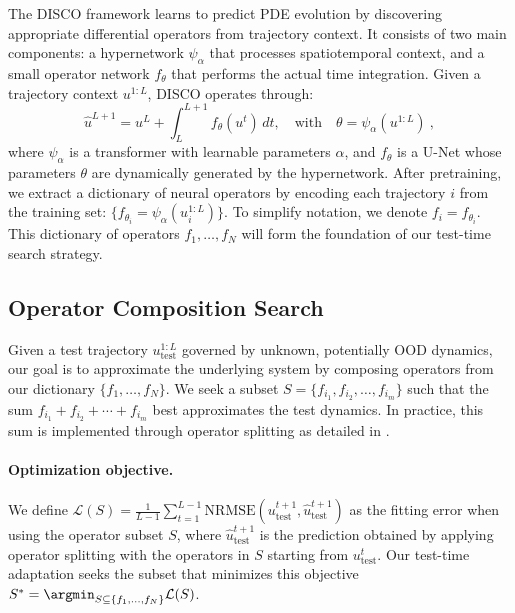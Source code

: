 \documentclass{article}
\theoremstyle{plain}
\theoremstyle{definition}
\theoremstyle{remark}
\begin{document}
The DISCO framework \citep{morel2025disco} learns to predict PDE evolution by discovering appropriate differential operators from trajectory context. It consists of two main components: a hypernetwork $\psi_\alpha$ that processes spatiotemporal context, and a small operator network $f_\theta$ that performs the actual time integration. Given a trajectory context $u^{1:L}$, DISCO operates through: 
$$
\hat{u}^{L+1} = u^L + \int_L^{L+1} f_\theta(u^t)\, dt, \quad \text{with} \quad \theta = \psi_\alpha(u^{1:L})~,
$$
where $\psi_\alpha$ 
is a transformer
with learnable parameters $\alpha$, and $f_\theta$ is a U-Net 
whose parameters $\theta$ are dynamically generated by the hypernetwork.
After pretraining, we extract a dictionary of neural operators by encoding each trajectory $i$ from the training set: 
$\{f_{\theta_i} = \psi_\alpha(u_i^{1:L})\}$. 
To simplify notation, we denote $f_i = f_{\theta_i}$. This dictionary of operators ${f_1, \ldots, f_N}$ will form the foundation of our test-time search strategy. 

\subsection{Operator Composition Search}
\label{subsec:search}

Given a test trajectory $u_{\text{test}}^{1:L}$ governed by unknown, potentially OOD dynamics, our goal is to approximate the underlying system by composing operators from our dictionary $\{f_1, \ldots, f_N\}$. We seek a subset $S = \{f_{i_1}, f_{i_2}, \ldots, f_{i_m}\}$ such that the sum $f_{i_1} + f_{i_2} + \cdots + f_{i_m}$ best approximates the test dynamics. In practice, this sum is implemented through operator splitting as detailed in .

\paragraph{Optimization objective.}
We define $\mathcal{L}(S) = \frac1{L-1}\sum_{t=1}^{L-1}\text{NRMSE}(u_{\text{test}}^{t+1}, \hat{u}_{\text{test}}^{t+1})$
as the fitting error when using the operator subset $S$, where $\hat{u}_{\text{test}}^{t+1}$ is the prediction obtained by applying operator splitting with the operators in $S$ starting from $u_{\text{test}}^t$. Our test-time adaptation seeks the subset that minimizes this objective
$S^* = \argmin_{S \subseteq \{f_1, \ldots, f_N\}} \mathcal{L}(S)$.
\end{document}
